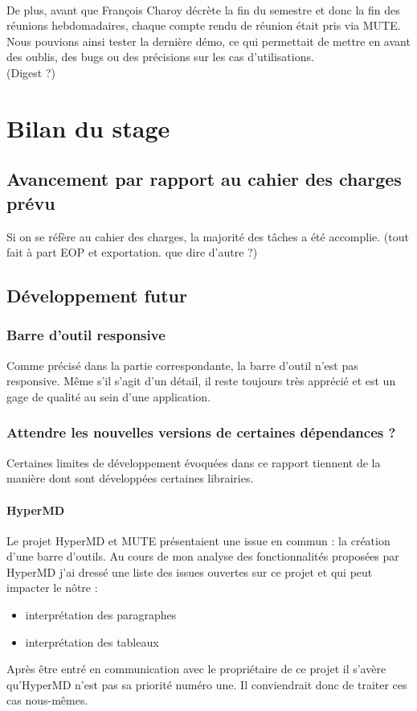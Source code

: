 \documentclass[12pt]{article}
\begin{document}
\paragraph{}
De plus, avant que François Charoy décrète la fin du semestre et donc la fin des réunions hebdomadaires, chaque compte rendu de réunion était pris via MUTE. Nous pouvions ainsi tester la dernière démo, ce qui permettait de mettre en avant des oublis, des bugs ou des précisions sur les cas d'utilisations.\\

(Digest ?)

\newpage
\section{Bilan du stage}
\subsection{Avancement par rapport au cahier des charges prévu}
Si on se réfère au cahier des charges, la majorité des tâches a été accomplie. (tout fait à part EOP et exportation. que dire d'autre ?)

\subsection{Développement futur}
\subsubsection{Barre d'outil responsive}
Comme précisé dans la partie correspondante, la barre d'outil n'est pas responsive. Même s'il s'agit d'un détail, il reste toujours très apprécié et est un gage de qualité au sein d'une application.

\subsubsection{Attendre les nouvelles versions de certaines dépendances ?}
Certaines limites de développement évoquées dans ce rapport tiennent de la manière dont sont développées certaines librairies.

\paragraph{HyperMD}
Le projet HyperMD et MUTE présentaient une issue en commun : la création d'une barre d'outils. Au cours de mon analyse des fonctionnalités proposées par HyperMD j'ai dressé une liste des issues ouvertes sur ce projet et qui peut impacter le nôtre :
\begin{itemize}
    \item interprétation des paragraphes
    \item interprétation des tableaux
\end{itemize}
Après être entré en communication avec le propriétaire de ce projet il s'avère qu'HyperMD n'est pas sa priorité numéro une. Il conviendrait donc de traiter ces cas nous-mêmes.
\end{document}
